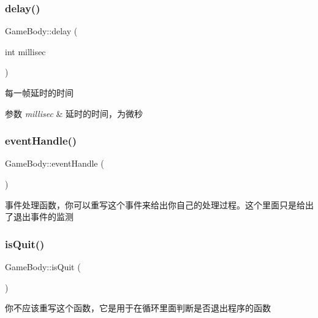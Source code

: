 \subsubsection{\texorpdfstring{delay()}{delay()}}
{\footnotesize\ttfamily Game\+Body\+::delay (\begin{DoxyParamCaption}\item[{int}]{millisec }\end{DoxyParamCaption})\hspace{0.3cm}{\ttfamily [virtual]}}



每一帧延时的时间 


\begin{DoxyParams}{参数}
{\em millisec} & 延时的时间，为微秒 \\
\hline
\end{DoxyParams}
\mbox{\label{class_game_body_a87994250c16faae42aeb68ff98031589}} 
\subsubsection{\texorpdfstring{eventHandle()}{eventHandle()}}
{\footnotesize\ttfamily Game\+Body\+::event\+Handle (\begin{DoxyParamCaption}{ }\end{DoxyParamCaption})\hspace{0.3cm}{\ttfamily [virtual]}}



事件处理函数，你可以重写这个事件来给出你自己的处理过程。这个里面只是给出了退出事件的监测 

\mbox{\label{class_game_body_a9ec4c012ae72dd25d849d6ebacb9357c}} 
\subsubsection{\texorpdfstring{isQuit()}{isQuit()}}
{\footnotesize\ttfamily Game\+Body\+::is\+Quit (\begin{DoxyParamCaption}{ }\end{DoxyParamCaption})\hspace{0.3cm}{\ttfamily [inline]}}



你不应该重写这个函数，它是用于在循环里面判断是否退出程序的函数 

